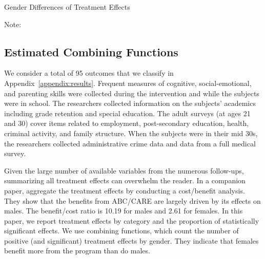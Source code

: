 \begin{table}
\centering
\begin{threeparttable}
\caption{Gender Differences of Treatment Effects}\label{table:genderdifference-tes}
\begin{scriptsize}

\end{scriptsize}
\begin{tablenotes}
\scriptsize
Note: 
\end{tablenotes}
\end{threeparttable}
\end{table}

\subsection{Estimated Combining Functions}

We consider a total of 95 outcomes that we classify in Appendix~\ref{appendix:results}. Frequent measures of cognitive, social-emotional, and parenting skills were collected during the intervention and while the subjects were in school. The researchers collected information on the subjects' academics including grade retention and special education. The adult surveys (at ages 21 and 30) cover items related to employment, post-secondary education, health, criminal activity, and family structure. When the subjects were in their mid 30s, the researchers collected administrative crime data and data from a full medical survey.

Given the large number of available variables from the numerous follow-ups, summarizing all treatment effects can overwhelm the reader. In a companion paper, \citet{Garcia_Heckman_Leaf_etal_2017_Comp_CBA_Unpublished} aggregate the treatment effects by conducting a cost/benefit analysis. They show that the benefits from ABC/CARE are largely driven by its effects on males. The benefit/cost ratio is 10.19 for males and 2.61 for females. In this paper, we report treatment effects by category and the proportion of statistically significant effects. We use combining functions, which count the number of positive (and significant) treatment effects by gender. They indicate that females benefit more from the program than do males.

